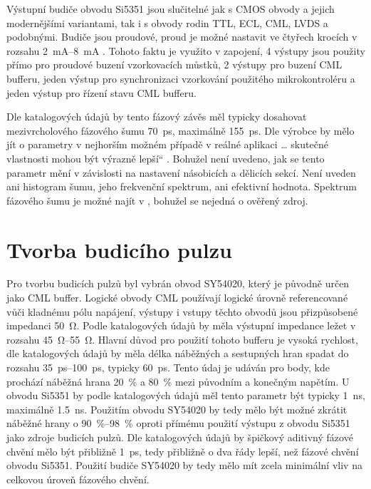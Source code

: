 Výstupní budiče obvodu Si5351 jsou slučitelné jak s \acrshort{CMOS} obvody a jejich modernějšími variantami, tak i s obvody rodin \acrshort{TTL}, \acrshort{ECL}, \acrshort{CML}, \acrshort{LVDS} a podobnými. Budiče jsou proudové, proud je možné nastavit ve čtyřech krocích v rozsahu \SIrange{2}{8}{\milli\ampere} \cite{Si5351datasheet}. Tohoto faktu je využito v zapojení, 4 výstupy jsou použity přímo pro proudové buzení vzorkovacích můstků, 2 výstupy pro buzení \acrshort{CML} bufferu, jeden výstup pro synchronizaci vzorkování použitého mikrokontroléru a jeden výstup pro řízení stavu \acrshort{CML} bufferu.

Dle katalogových údajů by tento fázový závěs měl typicky dosahovat mezivrcholového fázového šumu \SI{70}{\pico\second}, maximálně  \SI{155}{\pico\second}. Dle výrobce by mělo jít o parametry v \quotedblbase nejhorším možném případě v reálné aplikaci \ldots{} skutečné vlastnosti mohou být výrazně lepší\textquotedblleft{} \cite{Si5351datasheet}. Bohužel není uvedeno, jak se tento parametr mění v závislosti na nastavení násobicích a dělicích sekcí. Není uveden ani histogram šumu, jeho frekvenční spektrum, ani efektivní hodnota. Spektrum fázového šumu je možné najít v \cite{Si5351_phase_noise_measurement}, bohužel se nejedná o ověřený zdroj.

\section{Tvorba budicího pulzu}
Pro tvorbu budicích pulzů byl vybrán obvod SY54020, který je původně určen jako \acrshort{CML} buffer. Logické obvody \acrshort{CML} používají logické úrovně referencované vůči kladnému pólu napájení, výstupy i vstupy těchto obvodů jsou přizpůsobené impedanci \SI{50}{\ohm}. Podle katalogových údajů \cite{SY54020datasheet} by měla výstupní impedance ležet v rozsahu \SIrange{45}{55}{\ohm}. Hlavní důvod pro použití tohoto bufferu je vysoká rychlost, dle katalogových údajů by měla délka náběžných a sestupných hran spadat do rozsahu \SIrange{35}{100}{\pico\second}, typicky \SI{60}{ps}. Tento údaj je udáván pro body, kde prochází náběžná hrana \SI{20}{\%} a \SI{80}{\%} mezi původním a konečným napětím. U obvodu Si5351 by podle katalogových údajů měl tento parametr být typicky \SI{1}{\nano\second}, maximálně \SI{1.5}{\nano\second}. Použitím obvodu SY54020 by tedy mělo být možné zkrátit náběžné hrany o \SIrange{90}{98}{\%} oproti přímému použití výstupu z obvodu Si5351 jako zdroje budicích pulzů. Dle katalogových údajů by špičkový aditivný fázové chvění mělo být přibližně \SI{1}{\pico\second}, tedy přibližně o dva řády lepší, než fázové chvění obvodu Si5351. Použití budiče SY54020 by tedy mělo mít zcela minimální vliv na celkovou úroveň fázového chvění.

